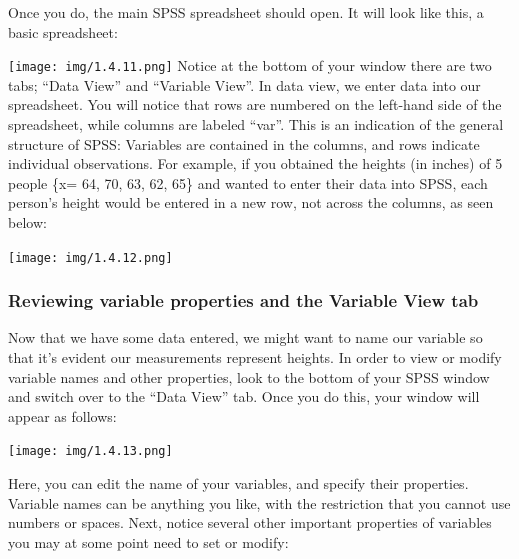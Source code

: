 \documentclass[
]{book}
\begin{document}
Once you do, the main SPSS spreadsheet should open. It will look like this, a basic spreadsheet:

\texttt{[image: img/1.4.11.png]}
Notice at the bottom of your window there are two tabs; ``Data View'' and ``Variable View''. In data view, we enter data into our spreadsheet. You will notice that rows are numbered on the left-hand side of the spreadsheet, while columns are labeled ``var''. This is an indication of the general structure of SPSS: Variables are contained in the columns, and rows indicate individual observations. For example, if you obtained the heights (in inches) of 5 people \{x= 64, 70, 63, 62, 65\} and wanted to enter their data into SPSS, each person's height would be entered in a new row, not across the columns, as seen below:

\texttt{[image: img/1.4.12.png]}

\hypertarget{reviewing-variable-properties-and-the-variable-view-tab}{%
\subsubsection{Reviewing variable properties and the Variable View tab}\label{reviewing-variable-properties-and-the-variable-view-tab}}

Now that we have some data entered, we might want to name our variable so that it's evident our measurements represent heights. In order to view or modify variable names and other properties, look to the bottom of your SPSS window and switch over to the ``Data View'' tab. Once you do this, your window will appear as follows:

\texttt{[image: img/1.4.13.png]}

Here, you can edit the name of your variables, and specify their properties. Variable names can be anything you like, with the restriction that you cannot use numbers or spaces. Next, notice several other important properties of variables you may at some point need to set or modify:
\end{document}
